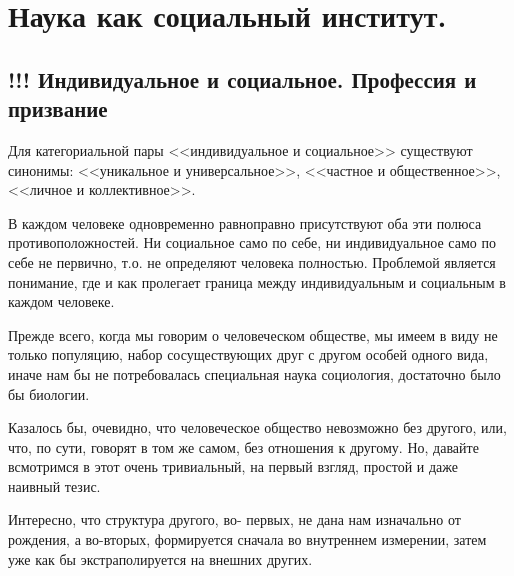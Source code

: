 \section{Наука как социальный институт.}

\subsection{!!! Индивидуальное и социальное. Профессия и призвание}

Для категориальной пары <<индивидуальное и социальное>> существуют синонимы: 
<<уникальное и универсальное>>, <<частное и общественное>>, <<личное и коллективное>>.
 
В каждом человеке одновременно равноправно присутствуют оба эти
полюса противоположностей. Ни социальное само по себе, ни индивидуальное само
по себе не первично, т.о. не определяют человека полностью. Проблемой является понимание, где и как пролегает граница между индивидуальным и социальным в каждом человеке. 



Прежде всего, когда мы говорим о человеческом
обществе, мы имеем в виду не только популяцию, набор сосуществующих друг с
другом особей одного вида, иначе нам бы не потребовалась специальная наука
социология, достаточно было бы биологии. 

Казалось бы, очевидно, что человеческое
общество невозможно без другого, или, что, по сути, говорят в том же самом, без
отношения к другому. Но, давайте всмотримся в этот очень тривиальный, на первый
взгляд, простой и даже наивный тезис. 

Интересно, что структура другого, во-
первых, не дана нам изначально от рождения, а во-вторых, формируется сначала во
внутреннем измерении, затем уже как бы экстраполируется на внешних других. 

